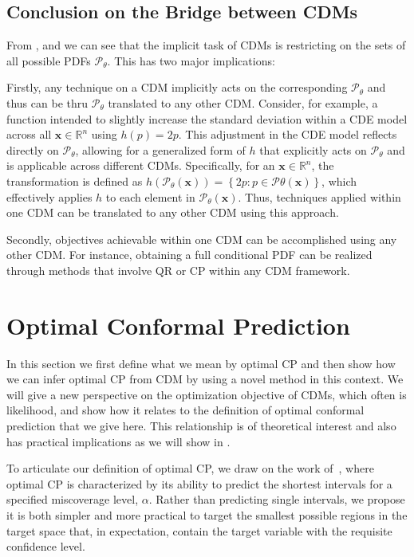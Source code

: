 \subsection{Conclusion on the Bridge between CDMs}

From ,  and  we can see that the implicit task of CDMs is restricting on the sets of all possible PDFs $\mathscr{P}_\theta$. This has two major implications:

Firstly, any technique on a CDM implicitly acts on the corresponding $\mathscr{P}_\theta$ and thus can be thru $\mathscr{P}_\theta$ translated to any other CDM. Consider, for example, a function intended to slightly increase the standard deviation within a CDE model across all $\mathbf{x} \in \mathbb{R}^n$ using $h(p) = 2p$. This adjustment in the CDE model reflects directly on $\mathscr{P}_\theta$, allowing for a generalized form of $h$ that explicitly acts on $\mathscr{P}_\theta$ and is applicable across different CDMs. Specifically, for an $\mathbf{x} \in \mathbb{R}^n$, the transformation is defined as $h(\mathscr{P}_{\theta}(\mathbf{x})) = \left\{2 p: p \in \mathscr{P}\theta(\mathbf{x}) \right\}$, which effectively applies $h$ to each element in $\mathscr{P}_\theta(\mathbf{x})$. Thus, techniques applied within one CDM can be translated to any other CDM using this approach.

Secondly, objectives achievable within one CDM can be accomplished using any other CDM. For instance, obtaining a full conditional PDF can be realized through methods that involve QR or CP within any CDM framework.

\section{Optimal Conformal Prediction}\label{sec:optimal_cp}

In this section we first define what we mean by optimal CP and then show how we can infer optimal CP from CDM by using a novel method in this context. We will give a new perspective on the optimization objective of CDMs, which often is likelihood, and show how it relates to the definition of optimal conformal prediction that we give here. This relationship is of theoretical interest and also has practical implications as we will show in .

To articulate our definition of optimal CP, we draw on the work of~\cite{sesia2021conformal}, where optimal CP is characterized by its ability to predict the shortest intervals for a specified miscoverage level, $\alpha$. Rather than predicting single intervals, we propose it is both simpler and more practical to target the smallest possible regions in the target space that, in expectation, contain the target variable with the requisite confidence level.

